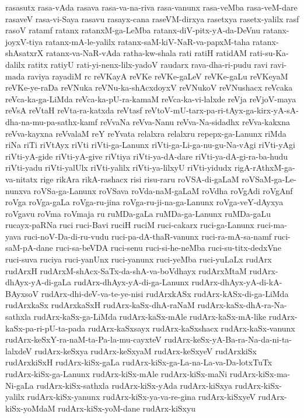 {rasasutx
rasa-vAda
rasava
rasa-va-na-riva
rasa-vanunx
rasa-veMba
rasa-veM-dare
rasaveV
rasa-vi-Saya
rasavu
rasayx-cana
raseVM-dirxya
rasetxya
rasetx-yalilx
rasf
rasoV
ratamf
ratanx
ratanxM-ga-LeMba
ratanx-diV-pitx-yA-da-DeVnu
ratanx-joyxV-tiya
ratanx-mA-le-yalilx
ratanx-saM-kiV-NaR-va-papxM-taha
ratanx-shAsatxrX
ratanx-va-NaR-vAda
ratha-kw-shala
rati
ratiH
ratidAM
rati-su-Ka-dalilx
ratitx
ratiyU
rati-yi-nenx-lilx-yadoV
raudarx
rava-dha-ri-pudu
ravi
ravi-mada
raviya
rayadiM
rc
reVKayA
reVKe
reVKe-gaLeV
reVKe-gaLu
reVKeyaM
reVKe-ye-raDa
reVNuka
reVNu-ka-shAcxdoyxV
reVNukoV
reVNushacx
reVcaka
reVca-ka-ga-LiMda
reVca-ka-pU-ra-kamaM
reVca-ka-vi-lalxde
reVja
reVjoV-maya
reVsA
reVtaH
reVta-ra-katxda
reVtasf
reVtoV-mU-tarx-pa-ri-tAyx-ga-kirx-yA-sA-dha-na-mu-pa-sathx-kamf
reVvaNa
reVva-Nanu
reVva-Na-sidadhx
reVva-kakxna
reVva-kayxna
reVvalaM
reY
reYvata
relalxra
relalxru
repepx-ga-Lanunx
riMda
riNa
riTi
riVtAyx
riVti
riVti-ga-Lanunx
riVti-ga-Li-ga-nu-gu-Na-vAgi
riVti-yAgi
riVti-yA-gide
riVti-yA-give
riVtiya
riVti-ya-dA-dare
riVti-ya-dA-gi-ra-ba-hudu
riVti-yadu
riVti-yalUlx
riVti-yalilx
riVti-ya-lilxyU
riVti-yidudx
rigA-rAthxM-ga-va-nitatx
rige
rikAra
rikA-rashacx
risi
risu-raru
roVSA-di-gaLaM
roVSaM-ga-Le-nunxva
roVSa-ga-Lanunx
roVSava
roVda-naM-gaLaM
roVdha
roVgAdi
roVgAnf
roVga
roVga-gaLa
roVga-ru-jina
roVga-ru-ji-na-ga-Lanunx
roVga-veY-dAyxya
roVgavu
roVma
roVmaja
ru
ruMDa-gaLa
ruMDa-ga-Lanunx
ruMDa-gaLu
rucayx-paRNa
ruci
ruci-Bavi
ruciH
ruciM
ruci-cakarx
ruci-ga-Lanunx
ruci-ma-yava
ruci-noV-Da-di-ru-vudu
ruci-pa-dA-thaR-vanunx
ruci-ra-mA-sa-namf
ruci-saM-pA-dane
ruci-sa-beVDA
ruci-senu
ruci-si-he-neMba
ruci-su-titx-dedxVne
ruci-suva
ruciya
ruci-yanUnx
ruci-yanunx
ruci-yeMba
ruci-yuLaLx
rudArx
rudArxH
rudArxM-shAcx-SaTx-da-shA-va-boVdhayx
rudArxMtaM
rudArx-dhAyx-yA-di-gaLa
rudArx-dhAyx-yA-di-ga-Lanunx
rudArx-dhAyx-yA-di-kA-BAyxsoV
rudArx-dhi-deV-va-te-ye-nisi
rudArxkASx
rudArx-kASx-di-ga-LiMda
rudArxkaSx
rudArxkaSxH
rudArx-kaSx-dhA-raNaM
rudArx-kaSx-dhA-ra-Na-sathxla
rudArx-kaSx-ga-LiMda
rudArx-kaSx-mAle
rudArx-kaSx-mA-like
rudArx-kaSx-pa-ri-pU-ta-pada
rudArx-kaSxsayx
rudArx-kaSxshacx
rudArx-kaSx-vanunx
rudArx-keSxY-ra-naM-ta-Pa-la-mu-cayxteV
rudArx-keSx-yA-Ba-ra-Na-da-ni-ta-lalxdeV
rudArx-keSxya
rudArx-keSxyaM
rudArx-keSxyeV
rudArxkiSx
rudArxkiSxH
rudArx-kiSx-gaLa
rudArx-kiSx-ga-La-na-La-va-Da-lotxTuTx
rudArx-kiSx-ga-Lanunx
rudArx-kiSx-mAle
rudArx-kiSx-maNi
rudArx-kiSx-ma-Ni-gaLa
rudArx-kiSx-sathxla
rudArx-kiSx-yAda
rudArx-kiSxya
rudArx-kiSx-yalilx
rudArx-kiSx-yanunx
rudArx-kiSx-ya-va-re-gina
rudArx-kiSxyeV
rudArx-kiSx-yoMdaM
rudArx-kiSx-yoM-dane
rudArx-kiSxyu
}
